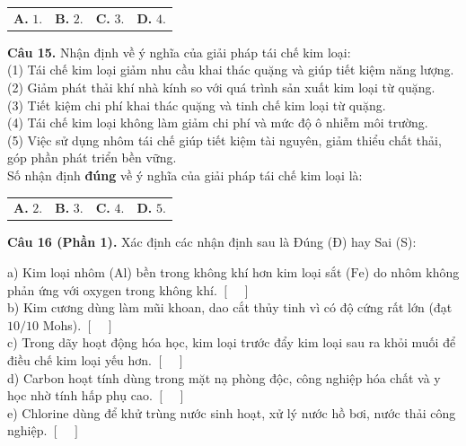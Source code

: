 \documentclass{article}
\begin{document}
\begin{tabularx}{\linewidth}{@{}X X X X@{}}
\textbf{A.} $1$. & \textbf{B.} $2$. & \textbf{C.} $3$. & \textbf{D.} $4$.
\end{tabularx}
\vspace*{\fill}
\newpage

\fontsize{24}{32}\selectfont
\textbf{Câu 15.} Nhận định về ý nghĩa của giải pháp tái chế kim loại:\\
(1) Tái chế kim loại giảm nhu cầu khai thác quặng và giúp tiết kiệm năng lượng.\\
(2) Giảm phát thải khí nhà kính so với quá trình sản xuất kim loại từ quặng.\\
(3) Tiết kiệm chi phí khai thác quặng và tinh chế kim loại từ quặng.\\
(4) Tái chế kim loại không làm giảm chi phí và mức độ ô nhiễm môi trường.\\
(5) Việc sử dụng nhôm tái chế giúp tiết kiệm tài nguyên, giảm thiểu chất thải, góp phần phát triển bền vững.\\
Số nhận định \textbf{đúng} về ý nghĩa của giải pháp tái chế kim loại là:
\vspace{12pt}

\begin{tabularx}{\linewidth}{@{}X X X X@{}}
\textbf{A.} $2$. & \textbf{B.} $3$. & \textbf{C.} $4$. & \textbf{D.} $5$.
\end{tabularx}
\vspace*{\fill}
\newpage

\fontsize{24}{32}\selectfont
\textbf{Câu 16 (Phần 1).} Xác định các nhận định sau là Đúng (Đ) hay Sai (S):
\vspace{12pt}

a) Kim loại nhôm ($\text{Al}$) bền trong không khí hơn kim loại sắt ($\text{Fe}$) do nhôm không phản ứng với oxygen trong không khí. \hfill $[\quad]$\\[10pt]
b) Kim cương dùng làm mũi khoan, dao cắt thủy tinh vì có độ cứng rất lớn (đạt $10/10$ Mohs). \hfill $[\quad]$\\[10pt]
c) Trong dãy hoạt động hóa học, kim loại trước đẩy kim loại sau ra khỏi muối để điều chế kim loại yếu hơn. \hfill $[\quad]$\\[10pt]
d) Carbon hoạt tính dùng trong mặt nạ phòng độc, công nghiệp hóa chất và y học nhờ tính hấp phụ cao. \hfill $[\quad]$\\[10pt]
e) Chlorine dùng để khử trùng nước sinh hoạt, xử lý nước hồ bơi, nước thải công nghiệp. \hfill $[\quad]$
\vspace*{\fill}
\newpage
\end{document}
